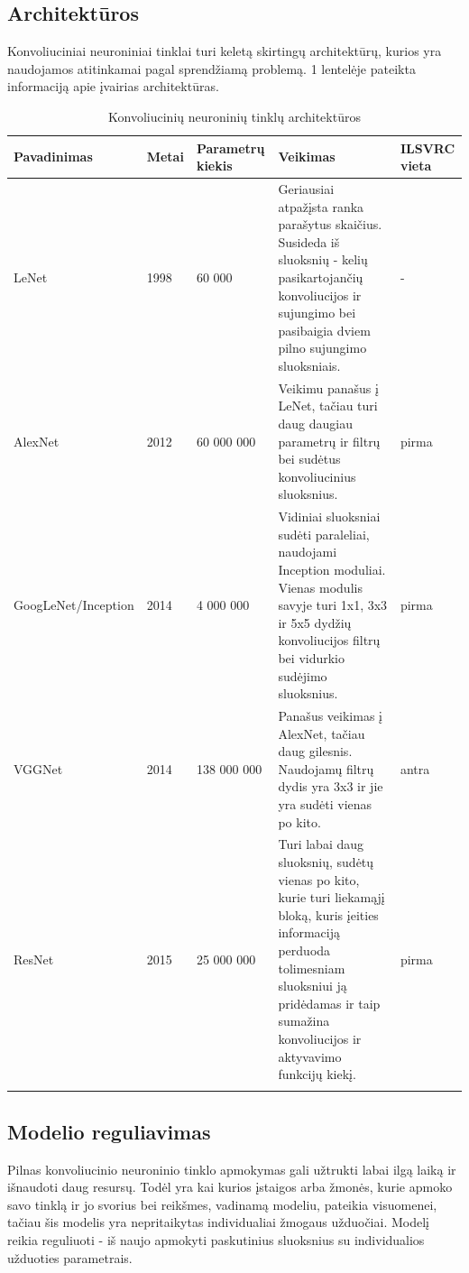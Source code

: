 \documentclass{VUMIFPSkursinis}
\begin{document}
\subsection{Architektūros}
Konvoliuciniai neuroniniai tinklai turi keletą skirtingų architektūrų, kurios yra naudojamos atitinkamai pagal sprendžiamą problemą. 1 lentelėje pateikta informaciją 
apie įvairias architektūras.


\begin{longtable}[h]{ | p{4cm} | p{1cm} | p{3cm} | p{5cm} | p{1.5cm} | } 
\hline
Pavadinimas & Metai & Parametrų kiekis & Veikimas & ILSVRC vieta \\
\hline
LeNet & 1998 & 60 000 & Geriausiai atpažįsta ranka parašytus skaičius. Susideda iš sluoksnių - kelių pasikartojančių konvoliucijos ir sujungimo bei pasibaigia dviem pilno sujungimo sluoksniais. & - \\
\hline
AlexNet & 2012 & 60 000 000 & Veikimu panašus į LeNet, tačiau turi daug daugiau parametrų ir filtrų bei sudėtus konvoliucinius sluoksnius.  & pirma \\
\hline
GoogLeNet/Inception & 2014 & 4 000 000 & Vidiniai sluoksniai sudėti paraleliai, naudojami Inception moduliai. Vienas modulis savyje turi 1x1, 3x3 ir 5x5 dydžių konvoliucijos filtrų bei vidurkio sudėjimo sluoksnius. & pirma \\
\hline
VGGNet & 2014 & 138 000 000 & Panašus veikimas į AlexNet, tačiau daug gilesnis. Naudojamų filtrų dydis yra 3x3 ir jie yra sudėti vienas po kito. & antra \\
\hline
ResNet & 2015 & 25 000 000 & Turi labai daug sluoksnių, sudėtų vienas po kito, kurie turi liekamąjį bloką, kuris įeities informaciją perduoda tolimesniam sluoksniui ją pridėdamas ir taip sumažina konvoliucijos ir aktyvavimo funkcijų kiekį.  & pirma \\
\hline
\caption{Konvoliucinių neuroninių tinklų architektūros}
\end{longtable}

\subsection{Modelio reguliavimas}
Pilnas konvoliucinio neuroninio tinklo apmokymas gali užtrukti labai ilgą laiką ir išnaudoti daug resursų. Todėl yra kai kurios įstaigos arba žmonės, kurie apmoko savo 
tinklą ir jo svorius bei reikšmes, vadinamą modeliu, pateikia visuomenei, tačiau šis modelis yra nepritaikytas individualiai žmogaus užduočiai. Modelį reikia 
reguliuoti - iš naujo apmokyti paskutinius sluoksnius su individualios užduoties parametrais.
\end{document}

